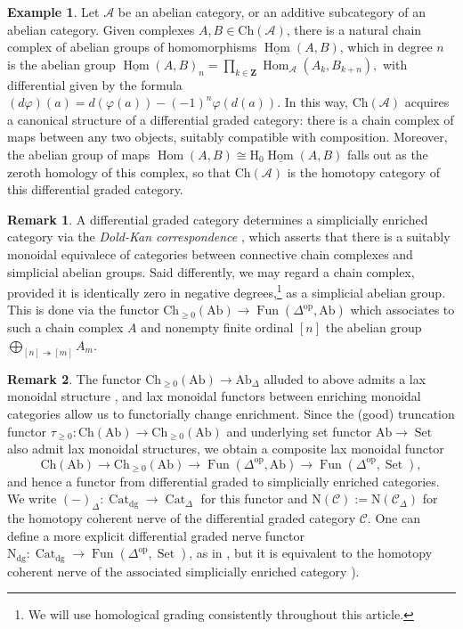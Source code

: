 \documentclass{article}
\theoremstyle{definition}
\newtheorem{example}{Example}[subsection]
\newtheorem{remark}{Remark}[subsection]
\newcommand{\A}{\mathcal{A}}
\newcommand{\C}{\mathcal{C}}
\newcommand{\ZZ}{\mathbf{Z}}
\newcommand{\too}{\longrightarrow}
\newcommand{\op}{\mathrm{op}}
\DeclareMathOperator{\Cat}{Cat}
\DeclareMathOperator{\Fun}{Fun}
\DeclareMathOperator{\Hom}{Hom}
\DeclareMathOperator{\Set}{Set}
\newcommand{\Ab}{\mathrm{Ab}}
\begin{document}
\begin{example}
Let ${\mathcal{A}}$ be an abelian category, or an additive subcategory of an abelian category.
Given complexes ${A, B \in \mathrm{Ch}(\mathcal{A})}$, there is a natural chain complex of abelian groups of homomorphisms $\underline{\Hom}(A, B)$, which in degree $n$ is the abelian group
$
{\underline{\Hom}(A, B)_n = \prod_{k\in\ZZ} \Hom_{\mathcal{A}}(A_k, B_{k+n})},
$
with differential given by the formula
$
(d\varphi)(a)=d(\varphi(a))-(-1)^n\varphi(d(a)).
$
In this way, ${\mathrm{Ch}(\mathcal{A})}$ acquires a canonical structure of a differential graded category: there is a chain complex of maps between any two objects, suitably compatible with composition.
Moreover, the abelian group of maps $\Hom(A,B)\cong \mathrm{H}_0\underline{\Hom}(A,B)$ falls out as the zeroth homology of this complex, so that $\mathrm{Ch}(\A)$ is the homotopy category of this differential graded category.
\end{example}


\begin{remark}\label{DK}
A differential graded category determines a simplicially enriched category via the {\em Dold-Kan correspondence}
 \cite{Wei94}, which asserts that there is a suitably monoidal equivalece of categories between connective chain complexes and simplicial abelian groups.
Said differently, we may regard a chain complex, provided it is identically zero in negative degrees,\footnote{We will use homological grading consistently throughout this article.}
as a simplicial abelian group.
This is done via the functor $\mathrm{Ch}_{\geq 0}( {\Ab}) \to\Fun(\Delta^{\op},\Ab)$ which associates to such a chain complex $A$ and nonempty finite ordinal $[n]$ the abelian group $\underset{[n]\twoheadrightarrow [m]}{\bigoplus}A_m$.
\end{remark}
\begin{remark}\label{dgn}
The functor $\mathrm{Ch}_{\geq 0}(\Ab)\to\Ab_\Delta$ alluded to above admits a lax monoidal structure \cite{Wei94}, and lax monoidal functors between enriching monoidal categories allow us to functorially change enrichment.
Since the (good) truncation functor $\tau_{\geq 0}:\mathrm{Ch}(\Ab)\to\mathrm{Ch}_{\geq 0}(\Ab)$ and underlying set functor $\Ab\to\Set$ also admit lax monoidal structures, we obtain a composite lax monoidal functor
\[
\mathrm{Ch}(\Ab)\too\mathrm{Ch}_{\geq 0}(\Ab)\too\Fun(\Delta^{\op},\Ab)\too\Fun(\Delta^{\op},\Set),
\]
and hence a functor from differential graded to simplicially enriched categories.
We write $(-)_\Delta:\Cat_\mathrm{dg}\to\Cat_\Delta$ for this functor and $\mathrm{N}(\C):=\mathrm{N}(\C_\Delta)$ for the homotopy coherent nerve of the differential graded category $\C$.
One can define a more explicit differential graded nerve functor $\mathrm{N_{dg}}:\Cat_\mathrm{dg}\to\Fun(\Delta^{\op},\Set)$, as in \cite[Construction 1.3.1.6]{HA}, but it is equivalent to the homotopy coherent nerve of the associated simplicially enriched category \cite[Proposition 1.3.1.17]{HA}).
\end{remark}
\end{document}

